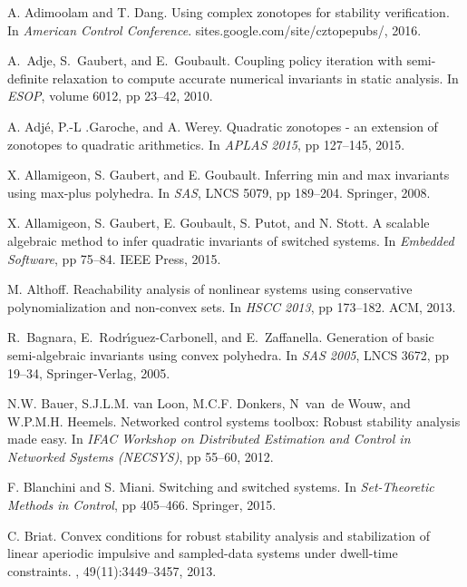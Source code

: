 \begin{thebibliography}{10}

A. Adimoolam and T. Dang.
\newblock Using complex zonotopes for stability verification.
\newblock In {\em American Control Conference}.
  sites.google.com/site/cztopepubs/, 2016.

A.~Adje, S.~Gaubert, and E.~Goubault.
\newblock Coupling policy iteration with semi-definite relaxation to compute
  accurate numerical invariants in static analysis.
\newblock In {\em ESOP}, volume 6012, pp 23--42, 2010.

A. Adj{\'{e}}, P.{-}L .Garoche, and A. Werey.
\newblock Quadratic zonotopes - an extension of zonotopes to quadratic
  arithmetics.
\newblock In {\em APLAS 2015}, pp 127--145, 2015.

X. Allamigeon, S. Gaubert, and E. Goubault.
\newblock Inferring min and max invariants using max-plus polyhedra.
\newblock In {\em SAS}, LNCS 5079, pp 189--204.
  {Springer}, 2008.

X. Allamigeon, S. Gaubert, E. Goubault, S. Putot, and
  N. Stott.
\newblock A scalable algebraic method to infer quadratic invariants of switched
  systems.
\newblock In {\em Embedded
  Software}, pp 75--84. IEEE Press, 2015.

M. Althoff.
\newblock Reachability analysis of nonlinear systems using conservative
  polynomialization and non-convex sets.
\newblock In {\em HSCC 2013}, pp 173--182. ACM, 2013.

R.~Bagnara, E.~Rodr{\'\i}guez-Carbonell, and E.~Zaffanella.
\newblock Generation of basic semi-algebraic invariants using convex polyhedra.
\newblock In {\em SAS 2005},
LNCS 3672, pp 19--34, Springer-Verlag, 2005.

N.W. Bauer, S.J.L.M. van Loon, M.C.F. Donkers, N~van~de Wouw, and W.P.M.H.
  Heemels.
\newblock Networked control systems toolbox: Robust stability analysis made
  easy.
\newblock In {\em IFAC Workshop on Distributed Estimation and Control in
  Networked Systems (NECSYS)}, pp 55--60, 2012.

F. Blanchini and S. Miani.
\newblock Switching and switched systems.
\newblock In {\em Set-Theoretic Methods in Control}, pp 405--466. Springer,
  2015.

C. Briat.
\newblock Convex conditions for robust stability analysis and stabilization of
  linear aperiodic impulsive and sampled-data systems under dwell-time
  constraints.
, 49(11):3449--3457, 2013.


\end{thebibliography}
